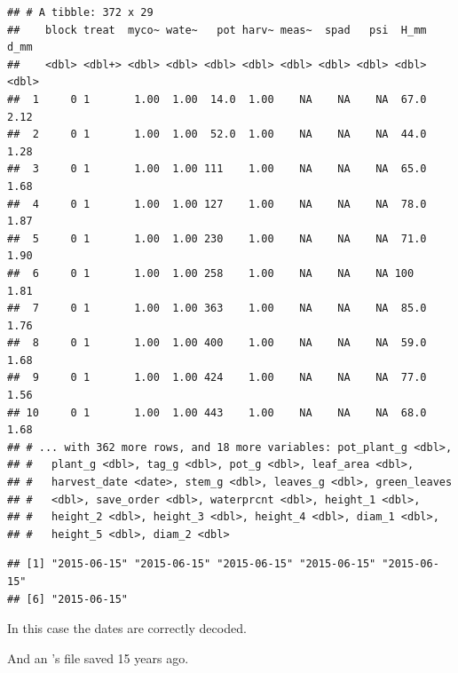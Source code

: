 \documentclass[krantz2,ChapterTOCs]{krantz}\usepackage{knitr}
\begin{document}
\begin{knitrout}\footnotesize
{}\color{fgcolor}\begin{kframe}
\begin{alltt}
 \hlkwb{<-} \hlstd{(} \hlstd{=} \hlstd{)}
\end{alltt}
\begin{verbatim}
## # A tibble: 372 x 29
##    block treat  myco~ wate~   pot harv~ meas~  spad   psi  H_mm  d_mm
##    <dbl> <dbl+> <dbl> <dbl> <dbl> <dbl> <dbl> <dbl> <dbl> <dbl> <dbl>
##  1     0 1       1.00  1.00  14.0  1.00    NA    NA    NA  67.0  2.12
##  2     0 1       1.00  1.00  52.0  1.00    NA    NA    NA  44.0  1.28
##  3     0 1       1.00  1.00 111    1.00    NA    NA    NA  65.0  1.68
##  4     0 1       1.00  1.00 127    1.00    NA    NA    NA  78.0  1.87
##  5     0 1       1.00  1.00 230    1.00    NA    NA    NA  71.0  1.90
##  6     0 1       1.00  1.00 258    1.00    NA    NA    NA 100    1.81
##  7     0 1       1.00  1.00 363    1.00    NA    NA    NA  85.0  1.76
##  8     0 1       1.00  1.00 400    1.00    NA    NA    NA  59.0  1.68
##  9     0 1       1.00  1.00 424    1.00    NA    NA    NA  77.0  1.56
## 10     0 1       1.00  1.00 443    1.00    NA    NA    NA  68.0  1.68
## # ... with 362 more rows, and 18 more variables: pot_plant_g <dbl>,
## #   plant_g <dbl>, tag_g <dbl>, pot_g <dbl>, leaf_area <dbl>,
## #   harvest_date <date>, stem_g <dbl>, leaves_g <dbl>, green_leaves
## #   <dbl>, save_order <dbl>, waterprcnt <dbl>, height_1 <dbl>,
## #   height_2 <dbl>, height_3 <dbl>, height_4 <dbl>, diam_1 <dbl>,
## #   height_5 <dbl>, diam_2 <dbl>
\end{verbatim}
\begin{alltt}
\hlopt{$}
\end{alltt}
\begin{verbatim}
## [1] "2015-06-15" "2015-06-15" "2015-06-15" "2015-06-15" "2015-06-15"
## [6] "2015-06-15"
\end{verbatim}
\end{kframe}
\end{knitrout}

In this case the dates are correctly decoded.

And an 's  file saved 15 years ago.
\end{document}
